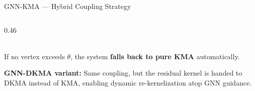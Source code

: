 \documentclass[aspectratio=169,10pt]{beamer}
\renewcommand{\footnotesize}{\tiny}
\begin{document}
\begin{frame}{GNN-KMA — Hybrid Coupling Strategy}
\begin{columns}[T]
\begin{column}{0.46\textwidth}
\begin{tcolorbox}[mybox,title=Why Precision-First?]
        \\[4pt]
        If no vertex exceeds $\theta$, the system
        \textbf{falls back to pure KMA} automatically.
      \end{tcolorbox}
      \vspace{5pt}
      \begin{tcolorbox}[greenbox,fontupper=\footnotesize]
        \textbf{GNN-DKMA variant:} Same coupling, but
        the residual kernel is handed to DKMA instead of KMA,
        enabling dynamic re-kernelization atop GNN guidance.
      \end{tcolorbox}
    \end{column}
  \end{columns}
\end{frame}

\end{document}
